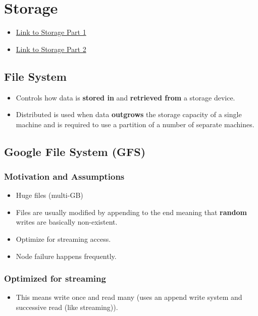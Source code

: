 \documentclass[12pt]{article}
\begin{document}
\section{Storage}
\begin{itemize}
    \item \href{https://id2221kth.github.io/slides/2023/02_storage_part1.pdf}{Link to Storage Part 1}
    \item \href{https://id2221kth.github.io/slides/2023/03_storage_part2.pdf}{Link to Storage Part 2}
\end{itemize}

\subsection{File System}
\begin{itemize}
    \item Controls how data is \textbf{stored in} and \textbf{retrieved from} a storage device.
    \item Distributed is used when data \textbf{outgrows} the storage capacity of a single machine and is required to use a partition of a number of separate machines.
\end{itemize}

\subsection{Google File System (GFS)}
\subsubsection{Motivation and Assumptions}
\begin{itemize}
    \item Huge files (multi-GB)
\end{itemize}

\begin{itemize}
    \item Files are usually modified by appending to the end meaning that \textbf{random} writes are basically non-existent.
    \item Optimize for streaming access.
    \item Node failure happens frequently.
\end{itemize}

\subsubsection{Optimized for streaming}
\begin{itemize}
    \item This means write once and read many (uses an append write system and successive read (like streaming)).
\end{itemize}
\end{document}
